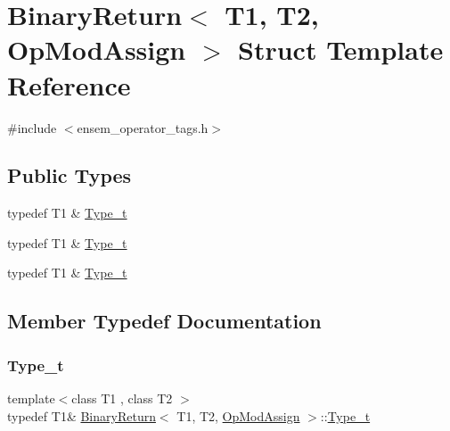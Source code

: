 \hypertarget{structBinaryReturn_3_01T1_00_01T2_00_01OpModAssign_01_4}{}\section{Binary\+Return$<$ T1, T2, Op\+Mod\+Assign $>$ Struct Template Reference}
\label{structBinaryReturn_3_01T1_00_01T2_00_01OpModAssign_01_4}


{\ttfamily \#include $<$ensem\+\_\+operator\+\_\+tags.\+h$>$}

\subsection*{Public Types}
\begin{DoxyCompactItemize}
\item 
typedef T1 \& \mbox{\hyperlink{structBinaryReturn_3_01T1_00_01T2_00_01OpModAssign_01_4_ae184d3c020adc86d2a8e45d393ea778c}{Type\+\_\+t}}
\item 
typedef T1 \& \mbox{\hyperlink{structBinaryReturn_3_01T1_00_01T2_00_01OpModAssign_01_4_ae184d3c020adc86d2a8e45d393ea778c}{Type\+\_\+t}}
\item 
typedef T1 \& \mbox{\hyperlink{structBinaryReturn_3_01T1_00_01T2_00_01OpModAssign_01_4_ae184d3c020adc86d2a8e45d393ea778c}{Type\+\_\+t}}
\end{DoxyCompactItemize}


\subsection{Member Typedef Documentation}
\mbox{\label{structBinaryReturn_3_01T1_00_01T2_00_01OpModAssign_01_4_ae184d3c020adc86d2a8e45d393ea778c}} 
\subsubsection{\texorpdfstring{Type\_t}{Type\_t}\hspace{0.1cm}{\footnotesize\ttfamily [1/3]}}
{\footnotesize\ttfamily template$<$class T1 , class T2 $>$ \\
typedef T1\& \mbox{\hyperlink{structBinaryReturn}{Binary\+Return}}$<$ T1, T2, \mbox{\hyperlink{structOpModAssign}{Op\+Mod\+Assign}} $>$\+::\mbox{\hyperlink{structBinaryReturn_3_01T1_00_01T2_00_01OpModAssign_01_4_ae184d3c020adc86d2a8e45d393ea778c}{Type\+\_\+t}}}

